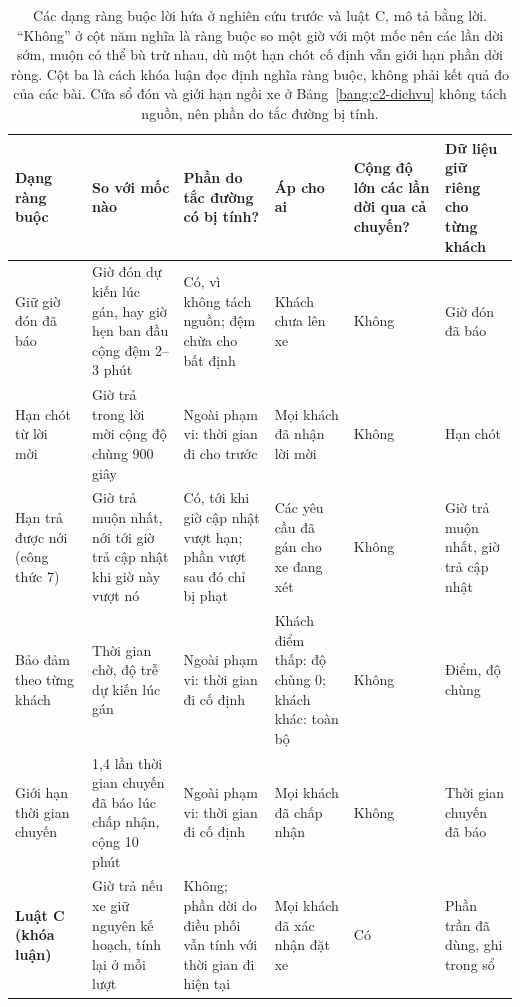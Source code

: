 \begin{table}[htbp]
\centering
\caption[Các dạng ràng buộc lời hứa so với luật C]{Các dạng ràng buộc lời hứa ở nghiên cứu trước và luật C, mô tả bằng lời. ``Không'' ở cột năm nghĩa là ràng
buộc so một giờ với một mốc nên các lần dời sớm, muộn có thể bù trừ nhau, dù một hạn chót cố định vẫn giới hạn phần
dời ròng. Cột ba là cách khóa luận đọc định nghĩa ràng buộc, không phải kết quả đo của các bài. Cửa sổ đón và giới
hạn ngồi xe ở Bảng~\ref{bang:c2-dichvu} không tách nguồn, nên phần do tắc đường bị tính.}
\label{bang:c2-dangrangbuoc}
\footnotesize
\setlength{\tabcolsep}{3pt}
\begin{tabular}{@{}p{2.6cm}p{2.7cm}p{2.9cm}p{2.3cm}p{1.8cm}p{2.6cm}@{}}
\toprule
\textbf{Dạng ràng buộc} & \textbf{So với mốc nào} & \textbf{Phần do tắc đường có bị tính?} & \textbf{Áp cho ai} &
\textbf{Cộng độ lớn các lần dời qua cả chuyến?} & \textbf{Dữ liệu giữ riêng cho từng khách}\\
\midrule
Giữ giờ đón đã báo~\cite{alonsomora2017,fielbaum2020,lu2024} & Giờ đón dự kiến lúc gán, hay giờ hẹn ban đầu cộng đệm
2--3 phút & Có, vì không tách nguồn; đệm chừa cho bất định & Khách chưa lên xe & Không & Giờ đón đã báo\\
Hạn chót từ lời mời~\cite{schulz2026} & Giờ trả trong lời mời cộng độ chùng 900 giây & Ngoài phạm vi: thời gian đi
cho trước & Mọi khách đã nhận lời mời & Không & Hạn chót\\
Hạn trả được nới (công thức 7)~\cite{horl2022} & Giờ trả muộn nhất, nới tới giờ trả cập nhật khi giờ này vượt nó &
Có, tới khi giờ cập nhật vượt hạn; phần vượt sau đó chỉ bị phạt & Các yêu cầu đã gán cho xe đang xét & Không & Giờ
trả muộn nhất, giờ trả cập nhật\\
Bảo đảm theo từng khách~\cite{elmi2026} & Thời gian chờ, độ trễ dự kiến lúc gán & Ngoài phạm vi: thời gian đi cố
định & Khách điểm thấp: độ chùng 0; khách khác: toàn bộ & Không & Điểm, độ chùng\\
Giới hạn thời gian chuyến~\cite{laupichler2026} & 1,4 lần thời gian chuyến đã báo lúc chấp nhận, cộng 10 phút &
Ngoài phạm vi: thời gian đi cố định & Mọi khách đã chấp nhận & Không & Thời gian chuyến đã báo\\
\textbf{Luật C (khóa luận)} & Giờ trả nếu xe giữ nguyên kế hoạch, tính lại ở mỗi lượt & Không; phần dời do điều phối
vẫn tính với thời gian đi hiện tại & Mọi khách đã xác nhận đặt xe & Có & Phần trần đã dùng, ghi trong sổ\\
\bottomrule
\end{tabular}
\end{table}


